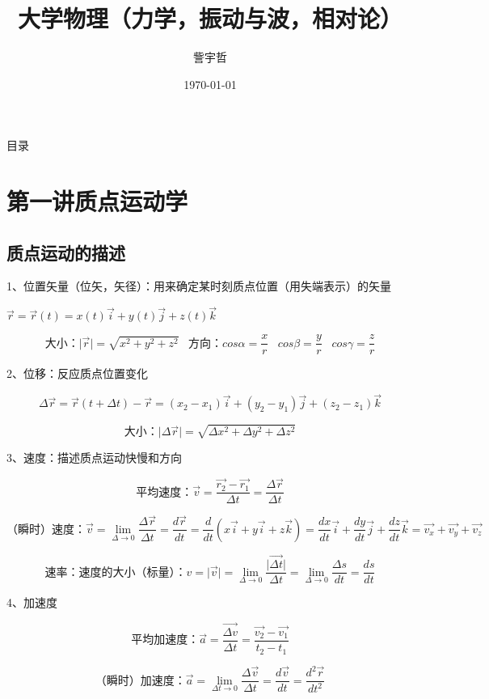 \documentclass[UTF8]{article}
\begin{document}
\title{大学物理（力学，振动与波，相对论）}
\author{訾宇哲}
\date{\today}
\maketitle
\newpage
\tableofcontents
\newpage
目录
\newpage
\section{第一讲\;\;质点运动学}
\subsection{质点运动的描述}

    1、位置矢量（位矢，矢径）：用来确定某时刻质点位置（用失端表示）的矢量

    \;\;$\vec{r} = \vec{r}(t) = x(t)\vec{i}+y(t)\vec{j}+z(t)\vec{k}$

    \;\;\[\mbox{大小：}\lvert\vec{r}\rvert = \sqrt{x^2+y^2+z^2}\;\;\;\mbox{方向：}cos\alpha = \frac{x}{r}\;\;\;cos\beta = \frac{y}{r}\;\;\;cos\gamma = \frac{z}{r}\]

    2、位移：反应质点位置变化

    \[\Delta \vec{r} = \vec{r}(t + \Delta t) - \vec{r} = (x_2 - x_1)\vec{i} + (y_2-y_1)\vec{j} + (z_2 - z_1)\vec{k}\]

    \[\mbox{大小：}\lvert\Delta\vec{r}\rvert = \sqrt{\Delta x^2 + \Delta y^2 + \Delta z^2}\]

    3、速度：描述质点运动快慢和方向

    \[\mbox{平均速度：}\vec{v} = \frac{\vec{r_2} - \vec{r_1}}{\Delta t}  = \frac{\Delta \vec{r}}{\Delta t}\]

    \[\mbox{（瞬时）速度：}\vec{v} = \lim_{\Delta \rightarrow 0}\frac{\Delta \vec{r}}{\Delta t} = \frac{d\vec{r}}{dt} = \frac{d}{dt}(x\vec{i}+y\vec{i}+z\vec{k}) = \frac{dx}{dt}\vec{i}+\frac{dy}{dt}\vec{j}+\frac{dz}{dt}\vec{k} = \vec{v_x}+\vec{v_y}+\vec{v_z}\]

    \[\mbox{速率：速度的大小（标量）：}v = \lvert\vec{v}\rvert = \lim_{\Delta \rightarrow 0}\frac{\lvert\vec{\Delta t}\rvert}{\Delta t} = \lim_{\Delta \rightarrow 0}\frac{\Delta s}{dt} = \frac{ds}{dt}\]

    4、加速度

    \[\mbox{平均加速度：}\vec{a} = \frac{\vec{\Delta v}}{\Delta t} = \frac{\vec{v_2} - \vec{v_1}}{t_2 - t_1}\]

    \[\mbox{（瞬时）加速度：}\vec{a} = \lim_{\Delta t \rightarrow 0}\frac{\Delta \vec{v}}{\Delta t} = \frac{d\vec{v}}{dt} = \frac{d^2\vec{r}}{dt^2}\]
\end{document}

